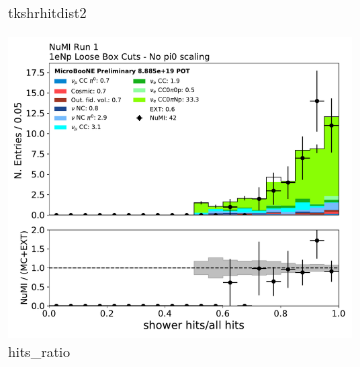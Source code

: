\begin{figure}[H]
\begin{subfigure}{0.3\textwidth}
    \caption{tkshrhitdist2}
    \end{subfigure}
    \begin{subfigure}{0.3\textwidth}
    \includegraphics[width=1.0\textwidth]{Sidebands/Figures/NuMI/1eNp/hits_ratio.pdf}
    \caption{hits\_ratio}
    \end{subfigure}
    \caption{} 
    \label{fig:NuMI_1eNp_3}
\end{figure}

